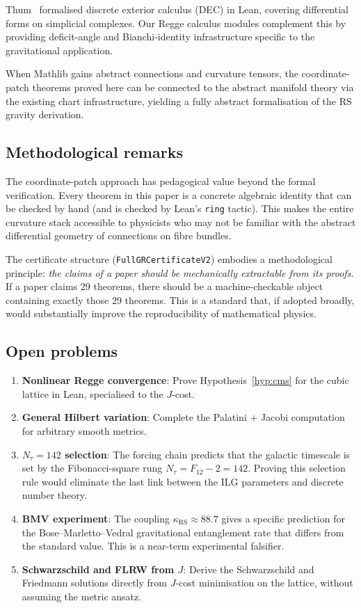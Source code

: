\documentclass[11pt,a4paper]{article}
\newcommand{\kRS}{\kappa_{\mathrm{RS}}}
\newcommand{\Jcost}{J}
\newcommand{\lean}[1]{\texttt{#1}}
\begin{document}
Thum~\cite{Thum2023} formalised discrete exterior calculus (DEC) in Lean, covering differential forms on simplicial complexes.
Our Regge calculus modules complement this by providing deficit-angle and Bianchi-identity infrastructure specific to the gravitational application.

When Mathlib gains abstract connections and curvature tensors, the coordinate-patch theorems proved here can be connected to the abstract manifold theory via the existing chart infrastructure, yielding a fully abstract formalisation of the RS gravity derivation.

\subsection{Methodological remarks}

The coordinate-patch approach has pedagogical value beyond the formal verification.
Every theorem in this paper is a concrete algebraic identity that can be checked by hand (and is checked by Lean's \texttt{ring} tactic).
This makes the entire curvature stack accessible to physicists who may not be familiar with the abstract differential geometry of connections on fibre bundles.

The certificate structure (\lean{FullGRCertificateV2}) embodies a methodological principle: \emph{the claims of a paper should be mechanically extractable from its proofs}.
If a paper claims 29 theorems, there should be a machine-checkable object containing exactly those 29 theorems.
This is a standard that, if adopted broadly, would substantially improve the reproducibility of mathematical physics.

\subsection{Open problems}

\begin{enumerate}
\item \textbf{Nonlinear Regge convergence}: Prove Hypothesis~\ref{hyp:cms} for the cubic lattice in Lean, specialised to the $\Jcost$-cost.
\item \textbf{General Hilbert variation}: Complete the Palatini + Jacobi computation for arbitrary smooth metrics.
\item \textbf{$N_\tau = 142$ selection}: The forcing chain predicts that the galactic timescale is set by the Fibonacci-square rung $N_\tau = F_{12} - 2 = 142$.
Proving this selection rule would eliminate the last link between the ILG parameters and discrete number theory.
\item \textbf{BMV experiment}: The coupling $\kRS \approx 88.7$ gives a specific prediction for the Bose--Marletto--Vedral gravitational entanglement rate that differs from the standard value.
This is a near-term experimental falsifier.
\item \textbf{Schwarzschild and FLRW from $\Jcost$}: Derive the Schwarzschild and Friedmann solutions directly from $\Jcost$-cost minimisation on the lattice, without assuming the metric ansatz.
\end{enumerate}
\end{document}
